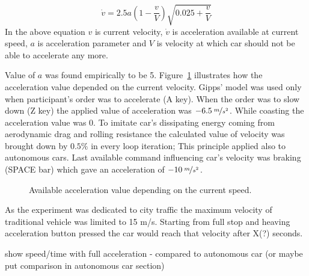 \documentclass[11pt,english]{article}
\begin{document}
\begin{equation}
\dot{v}=2.5a(1- \frac{v}{V})\sqrt{0.025+ \frac{v}{V}}
\end{equation}
In the above equation $v$ is current velocity, $\dot{v}$ is acceleration available at current speed, $a$ is acceleration parameter and $V$ is velocity at which car should not be able to accelerate any more.

Value of $a$ was found empirically to be 5. Figure~\ref{fig:gipps} illustrates how the acceleration value depended on the current velocity. Gipps' model was used only when participant's order was to accelerate (A key). When the order was to slow down (Z key) the applied value of acceleration was $-6.5\:\nicefrac{m}{s^2}$. While coasting the acceleration value was $0$. To imitate car's dissipating energy coming from aerodynamic drag and rolling resistance the calculated value of velocity was brought down by $0.5\%$ in every loop iteration; This principle applied also to autonomous cars. Last available command influencing car's velocity was braking (SPACE bar) which gave an acceleration of $-10\:\nicefrac{m}{s^2}$.


\begin{figure}[!] %
\caption{Available acceleration value depending on the current speed.}
\label{fig:gipps}
\end{figure} 

As the experiment was dedicated to city traffic the maximum velocity of traditional vehicle was limited to 15 m/s. Starting from full stop and heaving acceleration button pressed the car would reach that velocity after X(?) seconds.





show speed/time with full acceleration - compared to autonomous car (or maybe put comparison in autonomous car section)
\end{document}
